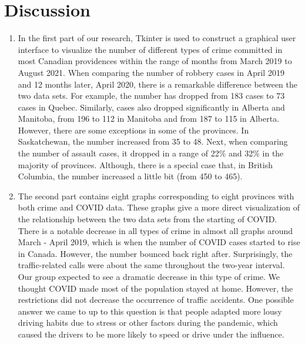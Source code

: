 \documentclass[fontsize=11pt]{article}
\begin{document}
\section*{Discussion}
\begin{enumerate}
\item In the first part of our research, Tkinter is used to construct a graphical user interface to visualize the number of different types of crime committed in most Canadian providences within the range of months from March 2019 to August 2021. When comparing the number of robbery cases in April 2019 and 12 months later, April 2020, there is a remarkable difference between the two data sets. For example, the number has dropped from 183 cases to 73 cases in Quebec. Similarly, cases also dropped significantly in Alberta and Manitoba, from 196 to 112 in Manitoba and from 187 to 115 in Alberta. However, there are some exceptions in some of the provinces. In Saskatchewan, the number increased from 35 to 48. Next, when comparing the number of assault cases, it dropped in a range of 22\% and 32\% in the majority of provinces. Although, there is a special case that, in British Columbia, the number increased a little bit (from 450 to 465). 

\item The second part contains eight graphs corresponding to eight provinces with both crime and COVID data. These graphs give a more direct visualization of the relationship between the two data sets from the starting of COVID. There is a notable decrease in all types of crime in almost all graphs around March - April 2019, which is when the number of COVID cases started to rise in Canada. However, the number bounced back right after. Surprisingly, the traffic-related calls were about the same throughout the two-year interval. Our group expected to see a dramatic decrease in this type of crime. We thought COVID made most of the population stayed at home. However, the restrictions did not decrease the occurrence of traffic accidents. One possible answer we came to up to this question is that people adapted more lousy driving habits due to stress or other factors during the pandemic, which caused the drivers to be more likely to speed or drive under the influence. 



\end{enumerate}
\end{document}
